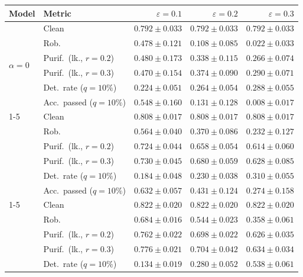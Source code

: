 \begin{table}[htbp]
  \centering
  \small
  \begin{tabular}{@{}llrrr@{}}
    \toprule
    Model & Metric & $\varepsilon=0.1$ & $\varepsilon=0.2$ & $\varepsilon=0.3$ \\
    \midrule
    \multirow{6}{*}{$\alpha{=}0$} & Clean & $0.792 \pm 0.033$ & $0.792 \pm 0.033$ & $0.792 \pm 0.033$ \\
     & Rob. & $0.478 \pm 0.121$ & $0.108 \pm 0.085$ & $0.022 \pm 0.033$ \\
     & Purif.\ (lk., $r{=}0.2$) & $0.480 \pm 0.173$ & $0.338 \pm 0.115$ & $0.266 \pm 0.074$ \\
     & Purif.\ (lk., $r{=}0.3$) & $0.470 \pm 0.154$ & $0.374 \pm 0.090$ & $0.290 \pm 0.071$ \\
     & Det.\ rate ($q{=}10\%$) & $\mathbf{0.224 \pm 0.051}$ & $0.264 \pm 0.054$ & $0.288 \pm 0.055$ \\
     & Acc.\ passed ($q{=}10\%$) & $0.548 \pm 0.160$ & $0.131 \pm 0.128$ & $0.008 \pm 0.017$ \\
    \cmidrule(lr){1-5}
    \multirow{6}{*}{$\alpha{=}0.01$} & Clean & $0.808 \pm 0.017$ & $0.808 \pm 0.017$ & $0.808 \pm 0.017$ \\
     & Rob. & $0.564 \pm 0.040$ & $0.370 \pm 0.086$ & $0.232 \pm 0.127$ \\
     & Purif.\ (lk., $r{=}0.2$) & $0.724 \pm 0.044$ & $0.658 \pm 0.054$ & $0.614 \pm 0.060$ \\
     & Purif.\ (lk., $r{=}0.3$) & $0.730 \pm 0.045$ & $0.680 \pm 0.059$ & $0.628 \pm 0.085$ \\
     & Det.\ rate ($q{=}10\%$) & $0.184 \pm 0.048$ & $0.230 \pm 0.038$ & $0.310 \pm 0.055$ \\
     & Acc.\ passed ($q{=}10\%$) & $0.632 \pm 0.057$ & $0.431 \pm 0.124$ & $0.274 \pm 0.158$ \\
    \cmidrule(lr){1-5}
    \multirow{6}{*}{$\alpha{=}0.1$} & Clean & $0.822 \pm 0.020$ & $0.822 \pm 0.020$ & $0.822 \pm 0.020$ \\
     & Rob. & $0.684 \pm 0.016$ & $\mathbf{0.544 \pm 0.023}$ & $\mathbf{0.358 \pm 0.061}$ \\
     & Purif.\ (lk., $r{=}0.2$) & $0.762 \pm 0.022$ & $0.698 \pm 0.022$ & $\mathbf{0.626 \pm 0.035}$ \\
     & Purif.\ (lk., $r{=}0.3$) & $0.776 \pm 0.021$ & $0.704 \pm 0.042$ & $\mathbf{0.634 \pm 0.034}$ \\
     & Det.\ rate ($q{=}10\%$) & $0.134 \pm 0.019$ & $0.280 \pm 0.052$ & $0.538 \pm 0.061$ \\

\end{tabular}
\end{table}
